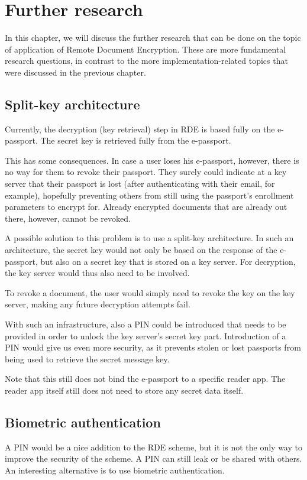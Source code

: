 \chapter{Further research}
\label{ch:further-research}
In this chapter, we will discuss the further research that can be done on the topic of application of Remote Document Encryption.
These are more fundamental research questions, in contrast to the more implementation-related topics that were discussed in the previous chapter.

\section{Split-key architecture}
\label{sec:split-key-architecture}
Currently, the decryption (key retrieval) step in RDE is based fully on the e-passport.
The secret key is retrieved fully from the e-passport.

This has some consequences.
In case a user loses his e-passport, however, there is no way for them to revoke their passport.
They surely could indicate at a key server that their passport is lost (after authenticating with their email, for example), hopefully preventing others from still using the passport's enrollment parameters to encrypt for.
Already encrypted documents that are already out there, however, cannot be revoked.

A possible solution to this problem is to use a split-key architecture.
In such an architecture, the secret key would not only be based on the response of the e-passport, but also on a secret key that is stored on a key server.
For decryption, the key server would thus also need to be involved.

To revoke a document, the user would simply need to revoke the key on the key server, making any future decryption attempts fail.

With such an infrastructure, also a PIN could be introduced that needs to be provided in order to unlock the key server's secret key part.
Introduction of a PIN would give us even more security, as it prevents stolen or lost passports from being used to retrieve the secret message key.

Note that this still does not bind the e-passport to a specific reader app.
The reader app itself still does not need to store any secret data itself.

\section{Biometric authentication}
\label{sec:biometric-authentication}
A PIN would be a nice addition to the RDE scheme, but it is not the only way to improve the security of the scheme.
A PIN can still leak or be shared with others.
An interesting alternative is to use biometric authentication.


